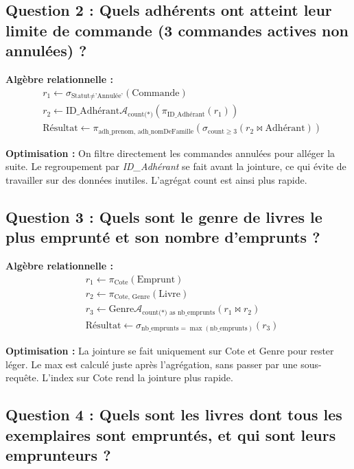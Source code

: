 \documentclass[12pt]{article}
\begin{document}
\subsection*{Question 2 : Quels adhérents ont atteint leur limite de commande (3 commandes actives non annulées) ?}

\textbf{Algèbre relationnelle :}
\[
\begin{aligned}
  &r_1 \leftarrow \sigma_{\text{Statut} \neq \text{'Annulée'}}(\text{Commande}) \\
  &r_2 \leftarrow \text{ID\_Adhérant} \mathcal{A}_{\text{count(*)}} (\pi_{\text{ID\_Adhérant}}(r_1)) \\
  &\text{Résultat} \leftarrow \pi_{\text{adh\_prenom, adh\_nomDeFamille}} (\sigma_{\text{count} \geq 3} (r_2 \bowtie \text{Adhérant}))
\end{aligned}
\]

\textbf{Optimisation :} 
On filtre directement les commandes annulées pour alléger la suite. Le regroupement par \textit{ID\_Adhérant} se fait
avant la jointure, ce qui évite de travailler sur des données inutiles. L’agrégat count est ainsi plus rapide.

\subsection*{Question 3 : Quels sont le genre de livres le plus emprunté et son nombre d’emprunts ?}

\textbf{Algèbre relationnelle :}
\[
\begin{aligned}
  &r_1 \leftarrow \pi_{\text{Cote}}(\text{Emprunt}) \\
  &r_2 \leftarrow \pi_{\text{Cote, Genre}}(\text{Livre}) \\
  &r_3 \leftarrow \text{Genre} \mathcal{A}_{\text{count(*) as nb\_emprunts}} (r_1 \bowtie r_2) \\
  &\text{Résultat} \leftarrow \sigma_{\text{nb\_emprunts} = \max(\text{nb\_emprunts})} (r_3)
\end{aligned}
\]

\textbf{Optimisation :}  
La jointure se fait uniquement sur Cote et Genre pour rester léger. Le max est calculé juste après l’agrégation,
sans passer par une sous-requête. L’index sur Cote rend la jointure plus rapide.


\subsection*{Question 4 : Quels sont les livres dont tous les exemplaires sont empruntés, et qui sont leurs emprunteurs ?}
\end{document}
